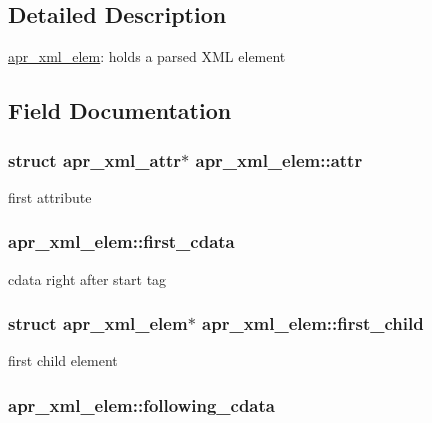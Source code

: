 \subsection{Detailed Description}
\hyperlink{structapr__xml__elem}{apr\-\_\-xml\-\_\-elem}\-: holds a parsed X\-M\-L element 

\subsection{Field Documentation}
\hypertarget{structapr__xml__elem_aa9c71585c0b2a32269852047aebdd61c}{
\subsubsection[{attr}]{\setlength{\rightskip}{0pt plus 5cm}struct {\bf apr\-\_\-xml\-\_\-attr}$\ast$ apr\-\_\-xml\-\_\-elem\-::attr}}\label{structapr__xml__elem_aa9c71585c0b2a32269852047aebdd61c}
first attribute \hypertarget{structapr__xml__elem_a732e8acd00e43330674fde57ef87163f}{
\subsubsection[{first\-\_\-cdata}]{ apr\-\_\-xml\-\_\-elem\-::first\-\_\-cdata}}\label{structapr__xml__elem_a732e8acd00e43330674fde57ef87163f}
cdata right after start tag \hypertarget{structapr__xml__elem_a620a28337f36592d4cb1f6dd3d2e97e0}{
\subsubsection[{first\-\_\-child}]{\setlength{\rightskip}{0pt plus 5cm}struct {\bf apr\-\_\-xml\-\_\-elem}$\ast$ apr\-\_\-xml\-\_\-elem\-::first\-\_\-child}}\label{structapr__xml__elem_a620a28337f36592d4cb1f6dd3d2e97e0}
first child element \hypertarget{structapr__xml__elem_a8d64c5343354e34c1cc7ac67f51cc89a}{
\subsubsection[{following\-\_\-cdata}]{ apr\-\_\-xml\-\_\-elem\-::following\-\_\-cdata}}\label{structapr__xml__elem_a8d64c5343354e34c1cc7ac67f51cc89a}
